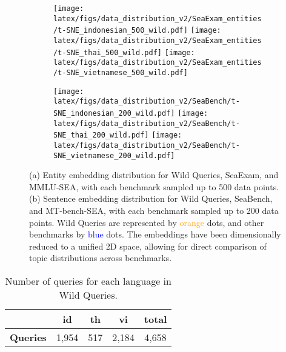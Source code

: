 \begin{figure*}[htb]
    \centering
    \begin{subfigure}[b]{\textwidth}
        \centering
         \texttt{[image: latex/figs/data\_distribution\_v2/SeaExam\_entities/t-SNE\_indonesian\_500\_wild.pdf]}
        \texttt{[image: latex/figs/data\_distribution\_v2/SeaExam\_entities/t-SNE\_thai\_500\_wild.pdf]}
        \texttt{[image: latex/figs/data\_distribution\_v2/SeaExam\_entities/t-SNE\_vietnamese\_500\_wild.pdf]}
        \caption{}
        \label{fig:subfigure1}
    \end{subfigure}
    \hfill
    \begin{subfigure}[b]{\textwidth}
        \centering
        \texttt{[image: latex/figs/data\_distribution\_v2/SeaBench/t-SNE\_indonesian\_200\_wild.pdf]}
        \texttt{[image: latex/figs/data\_distribution\_v2/SeaBench/t-SNE\_thai\_200\_wild.pdf]}
        \texttt{[image: latex/figs/data\_distribution\_v2/SeaBench/t-SNE\_vietnamese\_200\_wild.pdf]}
        \caption{}
        \label{fig:subfigure2}
    \end{subfigure}
    
    \caption{(a) Entity embedding distribution for Wild Queries, SeaExam, and MMLU-SEA, with each benchmark sampled up to 500 data points. (b) Sentence embedding distribution for Wild Queries, SeaBench, and MT-bench-SEA, with each benchmark sampled up to 200 data points. Wild Queries are represented by \textcolor{orange}{orange} dots, and other benchmarks by \textcolor{blue}{blue} dots. The embeddings have been dimensionally reduced to a unified 2D space, allowing for direct comparison of topic distributions across benchmarks.}
    \label{fig:data_distribution}
\end{figure*}




\begin{table}[htb]
\centering
\small
\begin{tabular}{lcccc}
\toprule
\textbf{}           & \textbf{id} & \textbf{th} & \textbf{vi} & \textbf{total}\\ 
\midrule
\textbf{Queries}    & 1,954                & 517           & 2,184       &  4,658         \\ 
\bottomrule
\end{tabular}
\caption{Number of queries for each language in Wild Queries.}
\label{tab:stats_wild_queries}
\end{table}
